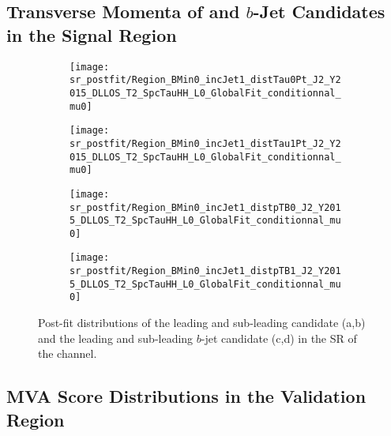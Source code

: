 \subsection*{Transverse Momenta of \tauhadvis and $b$-Jet Candidates in the
  Signal Region}

\begin{figure}[htbp]
  \centering

  \begin{subfigure}{0.495\textwidth}
    \centering

    \texttt{[image: sr\_postfit/Region\_BMin0\_incJet1\_distTau0Pt\_J2\_Y2015\_DLLOS\_T2\_SpcTauHH\_L0\_GlobalFit\_conditionnal\_mu0]}
    \subcaption{}
  \end{subfigure}\hfill%
  \begin{subfigure}{0.495\textwidth}
    \centering

    \texttt{[image: sr\_postfit/Region\_BMin0\_incJet1\_distTau1Pt\_J2\_Y2015\_DLLOS\_T2\_SpcTauHH\_L0\_GlobalFit\_conditionnal\_mu0]}
    \subcaption{}
  \end{subfigure}

  \begin{subfigure}{0.495\textwidth}
    \centering

    \texttt{[image: sr\_postfit/Region\_BMin0\_incJet1\_distpTB0\_J2\_Y2015\_DLLOS\_T2\_SpcTauHH\_L0\_GlobalFit\_conditionnal\_mu0]}
    \subcaption{}
  \end{subfigure}\hfill%
  \begin{subfigure}{0.495\textwidth}
    \centering

    \texttt{[image: sr\_postfit/Region\_BMin0\_incJet1\_distpTB1\_J2\_Y2015\_DLLOS\_T2\_SpcTauHH\_L0\_GlobalFit\_conditionnal\_mu0]}
    \subcaption{}
  \end{subfigure}

  \caption[Post-fit distributions of the leading and sub-leading \tauhadvis
  candidate \pT and the leading and sub-leading $b$-jet candidate \pT in the SR
  of the \hadhad channel.]{Post-fit distributions of the leading and sub-leading
    \tauhadvis candidate \pT (a,b) and the leading and sub-leading $b$-jet
    candidate \pT (c,d) in the SR of the \hadhad channel.}
\end{figure}


\clearpage
\subsection*{MVA Score Distributions in the \ZJets Validation Region}


